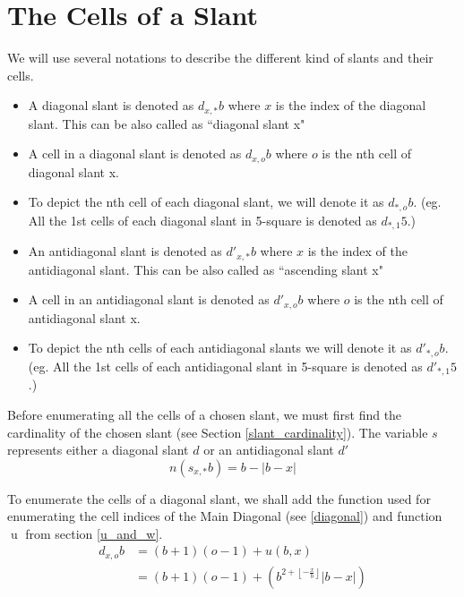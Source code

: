 \documentclass[twoside,openany,12pt]{book}
\begin{document}
    \section{The Cells of a Slant} \label{cells_of_a_slant}
    We will use several notations to describe the different kind of slants and their cells.
    \begin{itemize}
        \item A diagonal slant is denoted as $d_{x,*}b$ where $x$ is the index of the diagonal slant. This can be also called as ``diagonal slant x"
        \item A cell in a diagonal slant is denoted as $d_{x,o}b$ where $o$ is the nth cell of diagonal slant x.
        \item To depict the nth cell of each diagonal slant, we will denote it as $d_{*,o}b$. (eg. All the 1st cells of each diagonal slant in 5-square is denoted as $d_{*,1}5$.)
        \item An antidiagonal slant is denoted as $d'_{x,*}b$ where $x$ is the index of the antidiagonal slant. This can be also called as ``ascending slant x"
        \item A cell in an antidiagonal slant is denoted as $d'_{x,o}b$ where $o$ is the nth cell of antidiagonal slant x.
        \item To depict the nth cells of each antidiagonal slants we will denote it as $d'_{*,o}b$. (eg. All the 1st cells of each antidiagonal slant in 5-square is denoted as $d'_{*,1}5$.)
    \end{itemize}

    Before enumerating all the cells of a chosen slant, we must first find the cardinality of the chosen slant (see Section \ref{slant_cardinality}). The variable $s$ represents either a diagonal slant $d$ or an antidiagonal slant $d'$
    \begin{equation}
        n(s_{x,*}b) = b - |b-x|
    \end{equation}


    To enumerate the cells of a diagonal slant, we shall add the function used for enumerating the cell indices of the Main Diagonal (see \ref{diagonal}) and function $\operatorname{u}$ from section \ref{u_and_w}.
    \begin{equation}
        \begin{split}
          d_{x,o}b &= (b+1)(o-1) + u(b,x) \\
                &= (b+1)(o-1) + (b^{2 + \left\lfloor -\frac{x}{b} \right\rfloor }|b-x|)
        \end{split}
    \end{equation}
\end{document}
